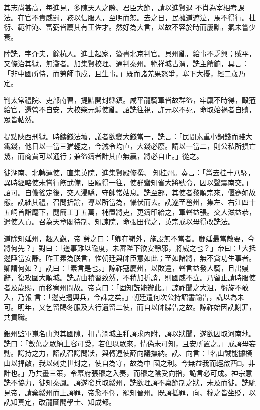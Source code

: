 \begin{pinyinscope}
 其志尚甚高，每進見，多陳天人之際、君臣大節，請以進賢退
 不肖為宰相考課法。在官不貴威罰，務以信服人，至明而恕。去之日，民擁道遮泣，馬不得行。杜衍、範仲淹、富弼皆薦其有王佐才。然好為大言，以故不容於時而屢黜，氣未嘗少衰。



 陸詵，字介夫，餘杭人。進士起家，簽書北京判官。貝州亂，給事不乏興；賊平，又條治其獄，無濫者。加集賢校理、通判秦州。範祥城古渭，詵主饋餉，具言：「非中國所恃，而勞師屯戍，且生事。」既而諸羌果怒爭，塞下大擾，經二歲乃
 定。



 判太常禮院、吏部南曹，提黠開封縣鎮。咸平龍騎軍皆故群盜，牢廩不時得，毆蒞給官，還營不自安，大校柴元煽使亂。詔詵往視，許元以不死，命取始禍者自贖，眾皆帖然。



 提點陜西刑獄。時鑄錢法壞，議者欲變大錢當一，詵言：「民間素重小銅錢而賤大鐵錢，他日以一當三猶輕之，今減令均直，大錢必廢。請以一當二，則公私所損亡幾，而商賈可以通行；兼盜鑄者計其直無贏，將必自止。」從之。



 徙湖南、北轉運使，直集英院，進集賢殿修撰、
 知桂州。奏言：「邕去桂十八驛，異時經略使未嘗行飭武備，臣願得一往，使群蠻知省大將號令，因以聲震南交。」詔可。自儂徭定後，交人浸驕，守帥常姑息。詵至部，其使者黎順宗來，偃蹇如故態。詵絀其禮，召問折諭，導以所當為，懾伏而去。詵遂至邕州，集左、右江四十五峒首詣麾下，閱簡工丁五萬，補置將吏，更鑄印給之，軍聲益張。交人滋益恭，遣使入貢。召為天章閣待制、知諫院，命張田代之，英宗戒以毋得改詵法。



 道除知延州，趣入覲，帝
 勞之曰：「卿在嶺外，施設無不當者。鄜延最當敵要，今將何先？」對曰：「邊事難以隃度，未審陛下欲安靜邪，將威之也？」帝曰：「大抵邊陲當安靜。昨王素為朕言，惟朝廷與帥臣意如此；至如諸將，無不貪功生事者。卿謂何如？」詵曰：「素言是也。」諒祚寇慶州，以敗還，聲言益發人騎，且出嫚辭，復攻圍大順城。詵謂由積習致然，不稍加折誚，則國威不立。乃留止請時服使者及歲賜，而移宥州問故。帝喜曰：「固知詵能辦此。」諒祚聞之大沮，盤旋不敢入，乃報
 言：「邊吏擅興兵，今誅之矣。」朝廷遣何次公持詔書諭告，詵以為未可。明年，又乞留賜冬服及大行遺留二使，而自以帥牒告之故。諒祚始因詵謝罪，共貢職。



 銀州監軍嵬名山與其國隙，扣青澗城主種諤求內附，諤以狀聞，遂欲因取河南地。詵曰：「數萬之眾納土容可受，若但以眾來，情偽未可知，且安所置之。」戒諤毋妄動。諤持之力，詔詵召諤問狀，與轉運使薛向議撫納。詵、向言：「名山誠能據橫山以捍敵，我以刺史世封之，使自為守，故為中
 國之利。今無益我而輕啟西□，非計也。」乃共畫三策，令幕府張穆之入奏，而穆之陰受向指，詭言必可成。神宗意詵不協力，徙知秦鳳。諤遂發兵取綏州，詵欲理諤不稟節制之狀，未及而徙。詵馳見帝，請棄綏州而上諤罪，帝愈不懌，罷知晉州。既諤抵罪，向、穆之皆坐貶，以詵知真定，改龍圖閣學士、知成都。




\end{pinyinscope}
